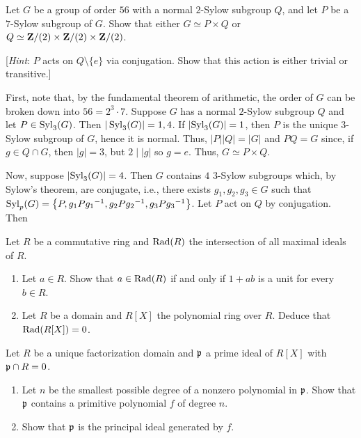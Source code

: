 \begin{problem}
  Let $G$ be a group of order $56$ with a normal $2$-Sylow subgroup $Q$,
  and let $P$ be a $7$-Sylow subgroup of $G$. Show that either $G\simeq
  P\times Q$ or $Q\simeq\mathbf{Z}/(2)\times\mathbf{Z}/(2)\times\mathbf{Z}/(2)$.

  [\emph{Hint}: $P$ acts on $Q\setminus\{e\}$ via conjugation. Show
  that this action is either trivial or transitive.]
\end{problem}
\begin{solution}
  First, note that, by the fundamental theorem of arithmetic, the order of
  $G$ can be broken down into $56=2^3 \cdot 7$. Suppose $G$ has a normal
  $2$-Sylow subgroup $Q$ and let $P\in\operatorname{Syl}_3(G)$. Then
  $|\operatorname{Syl}_3(G)|=1,4$. If $|{\operatorname{Syl}_3(G)}|=1$, then $P$ is the unique $3$-Sylow
  subgroup of $G$, hence it is normal. Thus, $|P||Q|=|G|$ and $PQ=G$ since,
  if $g\in Q\cap G$, then $|g|=3$, but $2\mid |g|$ so $g=e$. Thus, $G\simeq
  P\times Q$.

  Now, suppose $|{\operatorname{Syl}_3(G)}|=4$. Then $G$ contains $4$ $3$-Sylow subgroups
  which, by Sylow's theorem, are conjugate, i.e., there exists
  $g_1,g_2,g_3\in G$ such that
  $\operatorname{Syl}_p(G)=\left\{P,g_1P{g_1}^{-1},g_2P{g_2}^{-1},g_3P{g_3}^{-1}\right\}$. Let
  $P$ act on $Q$ by conjugation. Then
\end{solution}

\begin{problem}
  Let $R$ be a commutative ring and $\operatorname{Rad}(R)$ the intersection of all
  maximal ideals of $R$.
  \begin{enumerate}[label=(\alph*),noitemsep]
  \item Let $a\in R$. Show that $a\in\operatorname{Rad}(R)$ if and only if $1+ab$ is a
    unit for every $b\in R$.
  \item Let $R$ be a domain and $R[X]$ the polynomial ring over
    $R$. Deduce that $\operatorname{Rad}(R[X])=0$.
  \end{enumerate}
\end{problem}
\begin{solution}
\end{solution}

\begin{problem}
  Let $R$ be a unique factorization domain and $\mathfrak{p}$ a prime ideal of $R[X]$
  with $\mathfrak{p}\cap R=0$.
  \begin{enumerate}[label=(\alph*),noitemsep]
  \item Let $n$ be the smallest possible degree of a nonzero polynomial in
    $\mathfrak{p}$. Show that $\mathfrak{p}$ contains a primitive polynomial $f$ of
    degree $n$.
  \item Show that $\mathfrak{p}$ is the principal ideal generated by $f$.
  \end{enumerate}
\end{problem}
\begin{solution}
\end{solution}

